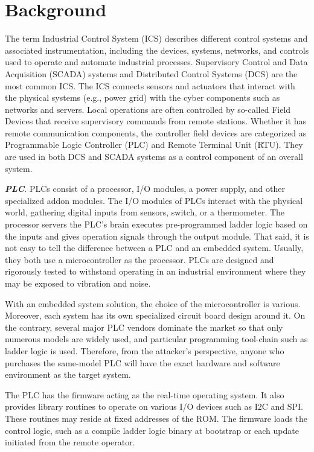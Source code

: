 \section{Background}
\label{sec:background}


The term Industrial Control System (ICS) describes different control systems and associated instrumentation, including the devices, systems, networks, and controls used to operate and automate industrial processes. Supervisory Control and Data Acquisition (SCADA) systems and Distributed Control Systems (DCS) are the most common ICS. The ICS connects sensors and actuators that interact with the physical systems (e.g., power grid) with the cyber components such as networks and servers. Local operations are often controlled by so-called Field Devices that receive supervisory commands from remote stations. Whether it has remote communication components, the controller field devices are categorized as Programmable Logic Controller (PLC) and Remote Terminal Unit (RTU). They are used in both DCS and SCADA systems as a control component of an overall system. 

\textbf{\textit{PLC}}. PLCs consist of a processor, I/O modules, a power supply, and other specialized addon modules. The I/O modules of PLCs interact with the physical world, gathering digital inputs from sensors, switch, or a thermometer. The processor servers the PLC's brain executes pre-programmed ladder logic based on the inputs and gives operation signals through the output module. That said, it is not easy to tell the difference between a PLC and an embedded system. Usually, they both use a microcontroller as the processor. PLCs are designed and rigorously tested to withstand operating in an industrial environment where they may be exposed to vibration and noise. 

With an embedded system solution, the choice of the microcontroller is various. Moreover, each system has its own specialized circuit board design around it. On the contrary, several major PLC vendors dominate the market so that only numerous models are widely used, and particular programming tool-chain such as ladder logic is used. Therefore, from the attacker's perspective, anyone who purchases the same-model PLC will have the exact hardware and software environment as the target system.

The PLC has the firmware acting as the real-time operating system. It also provides library routines to operate on various I/O devices such as I2C and SPI. These routines may reside at fixed addresses of the ROM. The firmware loads the control logic, such as a compile ladder logic binary at bootstrap or each update initiated from the remote operator.

